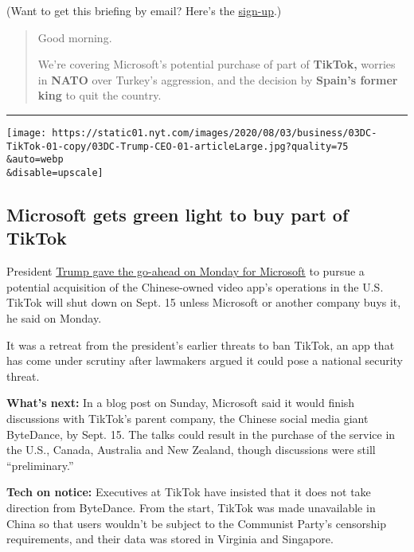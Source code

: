 (Want to get this briefing by email? Here's the
\href{https://www.nytimes.com/morning-briefing}{sign-up}.)

\begin{quote}
Good morning.

We're covering Microsoft's potential purchase of part of
\textbf{TikTok,} worries in \textbf{NATO} over Turkey's aggression, and
the decision by \textbf{Spain's former king} to quit the country.
\end{quote}

\begin{center}\rule{0.5\linewidth}{\linethickness}\end{center}

\texttt{[image: https://static01.nyt.com/images/2020/08/03/business/03DC-TikTok-01-copy/03DC-Trump-CEO-01-articleLarge.jpg?quality=75\\\&auto=webp\\\&disable=upscale]}

\hypertarget{microsoft-gets-green-light-to-buy-part-of-tiktok}{%
\subsection{Microsoft gets green light to buy part of
TikTok}\label{microsoft-gets-green-light-to-buy-part-of-tiktok}}

President
\href{https://www.nytimes.com/2020/08/03/technology/trump-tiktok-microsoft.html?action=click\&module=Top\%20Stories\&pgtype=Homepage}{Trump
gave the go-ahead on Monday for Microsoft} to pursue a potential
acquisition of the Chinese-owned video app's operations in the U.S.
TikTok will shut down on Sept. 15 unless Microsoft or another company
buys it, he said on Monday.

It was a retreat from the president's earlier threats to ban TikTok, an
app that has come under scrutiny after lawmakers argued it could pose a
national security threat.

\textbf{What's next:} In a blog post on Sunday, Microsoft said it would
finish discussions with TikTok's parent company, the Chinese social
media giant ByteDance, by Sept. 15. The talks could result in the
purchase of the service in the U.S., Canada, Australia and New Zealand,
though discussions were still ``preliminary.''

\textbf{Tech on notice:} Executives at TikTok have insisted that it does
not take direction from ByteDance. From the start, TikTok was made
unavailable in China so that users wouldn't be subject to the Communist
Party's censorship requirements, and their data was stored in Virginia
and Singapore.

